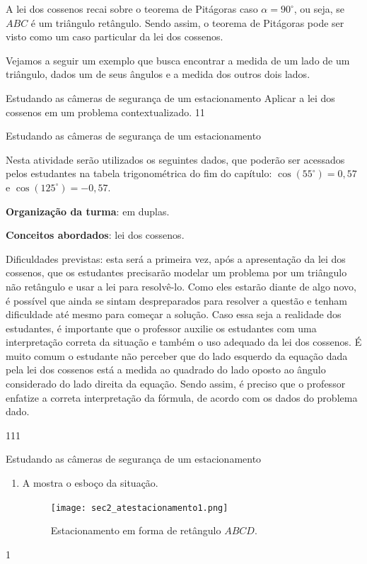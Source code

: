 A lei dos cossenos recai sobre o teorema de Pitágoras caso $\alpha=90^\circ$, ou seja, se $ABC$ é um triângulo retângulo. Sendo assim, o teorema de Pitágoras pode ser visto como um caso particular da lei dos cossenos.

Vejamos a seguir um exemplo que busca encontrar a medida de um lado de um triângulo, dados um de seus ângulos e a medida dos outros dois lados.
\clearmargin
\def\currentcolor{session2}
\begin{objectives}{Estudando as câmeras de segurança de um estacionamento}
{
Aplicar a lei dos cossenos em um problema contextualizado. 
}{1}{1}
\end{objectives}
\begin{sugestions}{Estudando as câmeras de segurança de um estacionamento}
{
Nesta atividade serão utilizados os seguintes dados, que poderão ser acessados pelos estudantes na tabela trigonométrica do fim do capítulo: $\cos (55^\circ)=0,57$ e $\cos(125^\circ)=-0,57$. 

\textbf{Organização da turma}: em duplas.

\textbf{Conceitos abordados}: lei dos cossenos.

Dificuldades previstas: esta será a primeira vez, após a apresentação da lei dos cossenos, que os estudantes precisarão modelar um problema por um triângulo não retângulo e usar a lei para resolvê-lo. Como eles estarão diante de algo novo, é possível que ainda se sintam despreparados para resolver a questão e tenham dificuldade até mesmo para começar a solução. Caso essa seja a realidade dos estudantes, é importante que o professor auxilie os estudantes com uma interpretação correta da situação e também o uso adequado da lei dos cossenos. É muito comum o estudante não perceber que do lado esquerdo da equação dada pela lei dos cossenos está a medida ao quadrado do lado oposto ao ângulo considerado do lado direita da equação. Sendo assim, é preciso que o professor enfatize a correta interpretação da fórmula, de acordo com os dados do problema dado.
}{1}{1}1
\end{sugestions}
\begin{answer}{Estudando as câmeras de segurança de um estacionamento}
{
\begin{enumerate}
\item{} 
    A  mostra o esboço da situação.
    \begin{figure}[H]
        \centering
        \texttt{[image: sec2\_atestacionamento1.png]}
        \caption{Estacionamento em forma de retângulo $ABCD$.}
        \label{sec2_resatestacionamento1}
    \end{figure}
\end{enumerate}
}{1}
\end{answer}

